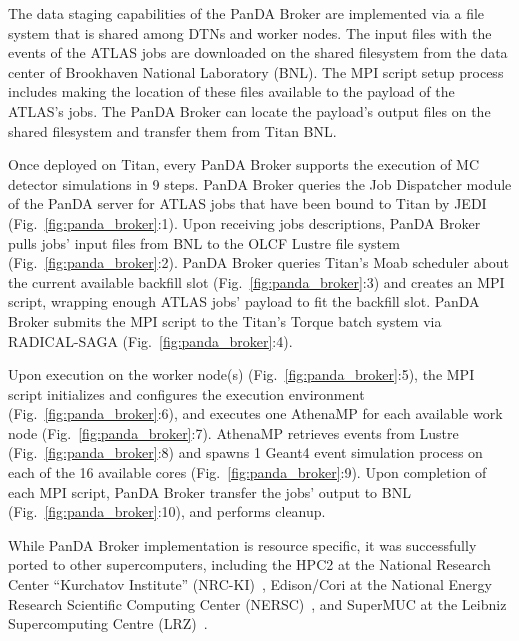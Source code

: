 The data staging capabilities of the PanDA Broker are implemented via a file
system that is shared among DTNs and worker nodes. The input files with the
events of the ATLAS jobs are downloaded on the shared filesystem from the data
center of Brookhaven National Laboratory (BNL). The MPI script setup process
includes making the location of these files available to the payload of the
ATLAS's jobs. The PanDA Broker can locate the payload's output files on the
shared filesystem and transfer them from Titan BNL.

Once deployed on Titan, every PanDA Broker supports the execution of MC detector
simulations in 9 steps. PanDA Broker queries the Job Dispatcher module of the
PanDA server for ATLAS jobs that have been bound to Titan by JEDI
(Fig.~\ref{fig:panda_broker}:1). Upon receiving jobs descriptions, PanDA Broker
pulls jobs' input files from BNL to the OLCF Lustre file system
(Fig.~\ref{fig:panda_broker}:2). PanDA Broker queries Titan's Moab scheduler
about the current available backfill slot (Fig.~\ref{fig:panda_broker}:3) and
creates an MPI script, wrapping enough ATLAS jobs' payload to fit the backfill
slot. PanDA Broker submits the MPI script to the Titan's Torque batch system via
RADICAL-SAGA (Fig.~\ref{fig:panda_broker}:4).

Upon execution on the worker node(s) (Fig.~\ref{fig:panda_broker}:5), the MPI
script initializes and configures the execution environment
(Fig.~\ref{fig:panda_broker}:6), and executes one AthenaMP for each available
work node (Fig.~\ref{fig:panda_broker}:7). AthenaMP retrieves events from Lustre
(Fig.~\ref{fig:panda_broker}:8) and spawns 1 Geant4 event simulation process on
each of the 16 available cores (Fig.~\ref{fig:panda_broker}:9). Upon completion
of each MPI script, PanDA Broker transfer the jobs' output to BNL
(Fig.~\ref{fig:panda_broker}:10), and performs cleanup.

While PanDA Broker implementation is resource specific, it was successfully
ported to other supercomputers, including the HPC2 at the National Research
Center ``Kurchatov Institute'' (NRC-KI)~\cite{belyaev2015integration},
Edison/Cori at the National Energy Research Scientific Computing Center
(NERSC)~\cite{barreiro2016panda}, and SuperMUC at the Leibniz Supercomputing
Centre (LRZ)~\cite{barreiro2016panda}.

